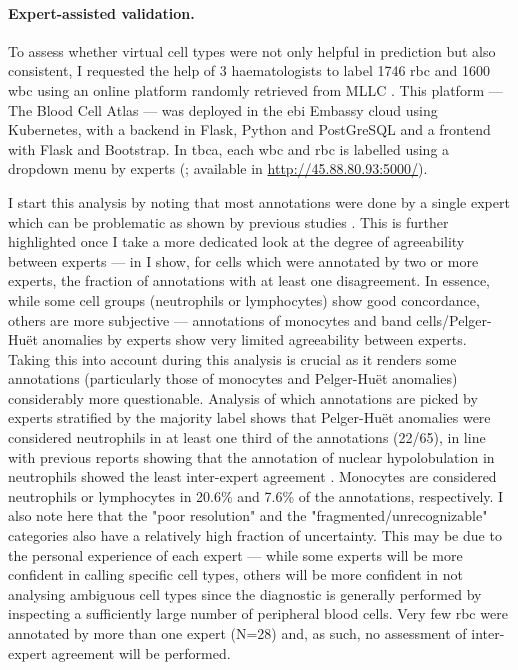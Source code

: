 \paragraph{Expert-assisted validation.} To assess whether virtual cell types were not only helpful in prediction but also consistent, I requested the help of 3 haematologists to label 1746 \ac{rbc} and 1600 \ac{wbc} using an online platform randomly retrieved from MLLC . This platform --- The Blood Cell Atlas --- was deployed in the \ac{ebi} Embassy cloud using Kubernetes, with a backend in Flask, Python and PostGreSQL and a frontend with Flask and Bootstrap. In \ac{tbca}, each \ac{wbc} and \ac{rbc} is labelled using a dropdown menu by experts (; available in \url{http://45.88.80.93:5000/}).

\begin{figure}[!ht]
    \label{fig:tbca}
\end{figure}

I start this analysis by noting that most annotations were done by a single expert which can be problematic as shown by previous studies \cite{De_Swart2017-wc,Howe2004-mn,Goasguen2009-dn,Foucar2020-uz}. This is further highlighted once I take a more dedicated look at the degree of agreeability between experts --- in  I show, for cells which were annotated by two or more experts, the fraction of annotations with at least one disagreement. In essence, while some cell groups (neutrophils or lymphocytes) show good concordance, others are more subjective --- annotations of monocytes and band cells/Pelger-Huët anomalies by experts show very limited agreeability between experts. Taking this into account during this analysis is crucial as it renders some annotations (particularly those of monocytes and Pelger-Huët anomalies) considerably more questionable. Analysis of which annotations are picked by experts stratified by the majority label shows that Pelger-Huët anomalies were considered neutrophils in at least one third of the annotations (22/65), in line with previous reports showing that the annotation of nuclear hypolobulation in neutrophils showed the least inter-expert agreement \cite{Weinberg2015-ra}. Monocytes are considered neutrophils or lymphocytes in 20.6\% and 7.6\% of the annotations, respectively. I also note here that the "poor resolution" and the "fragmented/unrecognizable" categories also have a relatively high fraction of uncertainty. This may be due to the personal experience of each expert --- while some experts will be more confident in calling specific cell types, others will be more confident in not analysing ambiguous cell types since the diagnostic is generally performed by inspecting a sufficiently large number of peripheral blood cells. Very few \ac{rbc} were annotated by more than one expert (N=28) and, as such, no assessment of inter-expert agreement will be performed.


